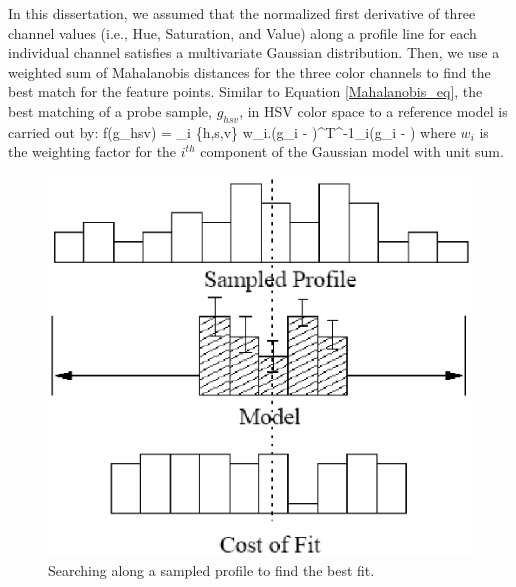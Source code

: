 In this dissertation, we assumed that the normalized first
derivative of three channel values (i.e., Hue, Saturation, and
Value) along a profile line for each individual channel satisfies a
multivariate Gaussian distribution. Then, we use a weighted sum of
Mahalanobis distances for the three color channels to find the best
match for the feature points. Similar to Equation
\ref{Mahalanobis_eq}, the best matching of a probe sample,
$g_{hsv}$, in HSV color space to a reference model is carried out
by: \beq f(g_{hsv}) = \sum_{i \in \{h,s,v\}} w_i.(g_i -
)^T\Sigma^{-1}_i(g_i - ) \eeq where
$w_i$ is the weighting factor for the $i^{th}$ component of the
Gaussian model with unit sum.
\begin{figure}[tbp]
\begin{center}
\includegraphics[scale=0.8]{./chapters/figures/profile.eps}
\caption{Searching along a sampled profile to find the best fit.}
\label{fig_profile}
\end{center}
\end{figure}
